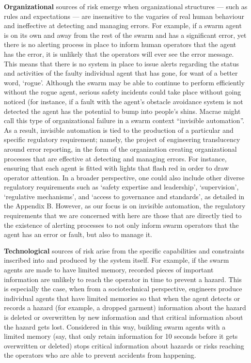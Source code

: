 \documentclass[lettersize,journal]{IEEEtran}
\begin{document}
\textbf{Organizational} sources of risk emerge when organizational structures — such as rules and expectations — are insensitive to the vagaries of real human behaviour and ineffective at detecting and managing errors. For example, if a swarm agent is on its own and away from the rest of the swarm and has a significant error, yet there is no alerting process in place to inform human operators that the agent has the error, it is unlikely that the operators will ever see the error message. This means that there is no system in place to issue alerts regarding the status and activities of the faulty individual agent that has gone, for want of a better word, `rogue’. Although the swarm may be able to continue to perform efficiently without the rogue agent, serious safety incidents could take place without going noticed (for instance, if a fault with the agent’s obstacle avoidance system is not detected the agent has the potential to bump into people’s shins. Macrae \cite{macrae2021learning} might call this type of organizational failure in a swarm context ``invisible automation”. As a result, invisible automation is tied to the production of a particular and specific regulatory requirement; namely, the project of engineering translucency around error reporting, in the form of the organization creating organizational processes that are effective at detecting and managing errors. For instance, ensuring that each agent is fitted with lights that flash red in order to draw operator attention. In a broader perspective, one could also include other diverse regulatory requirements such as `safety expertise and leadership’, `supervision’, `regulative mechanisms’, and `access to governance and standards', as detailed in the Appendix B. However, as our focus is on invisible automation, the regulatory requirements that we are concerned with here are those that are directly tied to the existence of alerting processes to not only inform swarm operators that the agent has an error or fault, but also to manage it.

\textbf{Technological} sources of risk arise from the specific capabilities and constraints inscribed into and produced by the system itself. For example, if the swarm agents are made to have limited memory, recorded pieces of important information are unlikely to reach the operator in time to prevent a hazard. This is especially the case, when from a sociotechnical perspective, engineers produce individual agents that have limited memories so that when the agent detects or records a hazard (for example, a dropped garment) information about the hazard is deleted or overwritten by new information and that critical information about the hazard gets lost. Considered in this way, building swarm agents with a limited memory (say, that only retain information for 10 seconds before it gets overwritten or deleted) stops critical information about hazards or risks reaching the operators who are able to prevent accidents from happening. 
\end{document}
